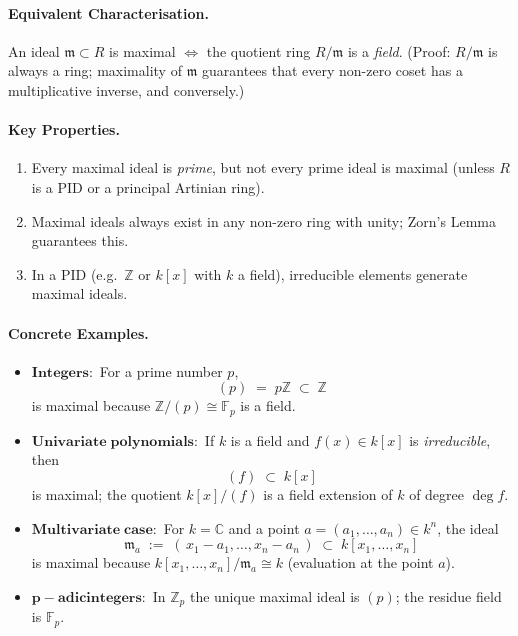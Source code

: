 \documentclass[12pt]{article}
\theoremstyle{definition} %
\theoremstyle{plain} %
\begin{document}
\medskip
\paragraph{Equivalent Characterisation.}
An ideal \( \mathfrak{m}\subset R \) is maximal  
\(\Longleftrightarrow\)
the quotient ring \( R/\mathfrak{m} \) is a \emph{field}.
(Proof: \(R/\mathfrak{m}\) is always a ring; maximality of
\( \mathfrak{m} \) guarantees that every non-zero coset
has a multiplicative inverse, and conversely.)

\medskip
\paragraph{Key Properties.}
\begin{enumerate}
  \item Every maximal ideal is \emph{prime}, but not every prime ideal
        is maximal (unless \(R\) is a PID or a principal Artinian ring).
  \item Maximal ideals always exist in any non-zero ring with unity;
        Zorn’s Lemma guarantees this.
  \item In a PID (e.g.\ \(\mathbb{Z}\) or \(k[x]\) with \(k\) a field),
        irreducible elements generate maximal ideals.
\end{enumerate}

\medskip
\paragraph{Concrete Examples.}
\begin{itemize}
  \item \(\mathbf{Integers:}\)
        For a prime number \(p\),
        \[
           (p)\;=\;p\mathbb{Z}\;\subset\;\mathbb{Z}
        \]
        is maximal because \(\mathbb{Z}/(p)\cong\mathbb{F}_{p}\)
        is a field.

  \item \(\mathbf{Univariate\;polynomials:}\)
        If \(k\) is a field and \(f(x)\in k[x]\) is \emph{irreducible},
        then
        \[
           (f)\;\subset\;k[x]
        \]
        is maximal; the quotient \(k[x]/(f)\) is a field extension of
        \(k\) of degree \(\deg f\).

  \item \(\mathbf{Multivariate\;case:}\)
        For \(k=\mathbb{C}\) and a point \(a=(a_{1},\dots,a_{n})\in k^{n}\),
        the ideal
        \[
           \mathfrak{m}_{a}
           \;:=\;
           (\,x_{1}-a_{1},\dots,x_{n}-a_{n}\,)
           \;\subset\;k[x_{1},\dots,x_{n}]
        \]
        is maximal because
        \(k[x_{1},\dots,x_{n}]/\mathfrak{m}_{a}\cong k\)
        (evaluation at the point \(a\)).

  \item \(\mathbf{p-adic integers:}\)
        In \(\mathbb{Z}_{p}\) the unique maximal ideal is
        \((p)\); the residue field is \(\mathbb{F}_{p}\).
\end{itemize}
\end{document}

